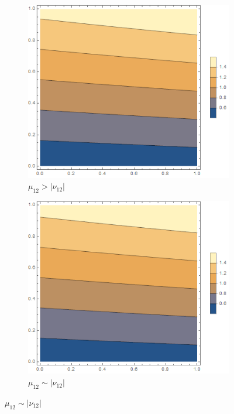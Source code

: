 \documentclass[12pt,a4]{article}
\begin{document}
\begin{figure}[!ht]
	\begin{subfigure}[b]{0.3\textwidth}
		\centering
		\includegraphics[width=\textwidth]{Joonised/Theta11Mu11Mu22I}
		\caption{$ \mu_{12} > |\nu_{12}| $}
	\end{subfigure}
	\hfill
	\begin{subfigure}[b]{0.3\textwidth}
		\centering
		\includegraphics[width=\textwidth]{Joonised/Theta11Mu11Mu22II}
		\caption{$ \mu_{12} \sim | \nu_{12}| $}

\end{subfigure}
\end{figure}
\end{document}
